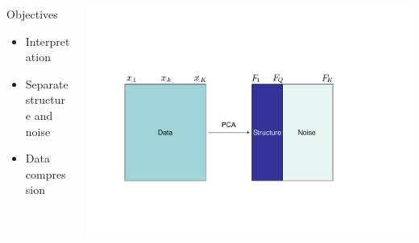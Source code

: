 \documentclass{beamer}\usepackage[]{graphicx}\usepackage[]{color}
\begin{document}
\begin{frame}
  \begin{columns}
  \begin{column}{.5\textwidth}
  \begin{block}{Objectives}
    \begin{itemize}
      \item Interpretation
      \item Separate structure and noise
      \item Data compression    
    \end{itemize}
  \end{block}
\end{column}
\begin{column}{0.5\textwidth}
\includegraphics[width=\textwidth]{dim_reduc.pdf}
  \end{column}
  \end{columns}
\end{frame}
\end{document}
